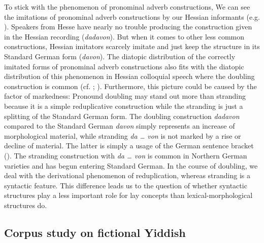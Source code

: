 \documentclass[output=paper]{LSP/langsci}
\begin{document}
To stick with the phenomenon of pronominal adverb constructions, We can see the imitations of pronominal adverb constructions by our Hessian informants (e.g. ). Speakers from Hesse have nearly no trouble producing the construction given in the Hessian recording (\textit{dadavon}). But when it comes to other less common constructions, Hessian imitators  scarcely imitate and just keep the structure in its Standard German form (\textit{davon}). The diatopic distribution of the correctly imitated forms of pronominal adverb constructions also fits with the diatopic distribution of this phenomenon in Hessian colloquial speech where the doubling construction is common (cf. \cite{leser_zum_2012}; \cite[Round 1 Questions 11, 12; Round 2 Question 21]{ADA}). Furthermore, this picture could be caused by the factor of markedness: Pronound doubling may stand out more than stranding because it is a simple reduplicative construction while the stranding is just a splitting of the Standard German form. The doubling construction \textit{dadavon} compared to the Standard German \textit{davon} simply represents an increase of morphological material, while stranding \textit{da … von} is not marked by a rise or decline of material. The latter is simply a usage of the German sentence bracket (\textit{}).  The stranding construction with \textit{da … von} is common in Northern German varieties and has begun entering Standard German. In the course of  doubling, we deal with the derivational phenomenon of reduplication, whereas stranding is a syntactic feature. This difference leads us to the question of whether syntactic structures play a less important role for lay concepts than lexical-morphological structures do.

 
	
\subsection{Corpus study on fictional Yiddish}\label{fiyi}
 
\end{document}
